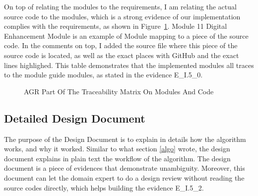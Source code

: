 On top of relating the modules to the requirements, I am relating the actual source code to the modules, which is a strong evidence of our implementation complies with the requirements, as shown in Figure~\ref{fig_agr_mtm_modules_code}. Module 11 Digital Enhancement Module is an example of Module mapping to a piece of the source code. In the comments on top, I added the source file where this piece of the source code is located, as well as the exact places with GitHub and the exact lines highlighed. This table demonstrates that the implemented modules all traces to the module guide modules, as stated in the evidence E\_I.5\_0.

\begin{figure}[H]
    \centering
    \caption[AGR Part Of The Traceability Matrix On Modules And Code]{AGR Part Of The Traceability Matrix On Modules And Code}
    \label{fig_agr_mtm_modules_code}
\end{figure}

\subsection{Detailed Design Document}
The purpose of the Design Document \cite{DD} is to explain in details how the algorithm works, and why it worked. Similar to what section \ref{algo} wrote, the design document explains in plain text the workflow of the algorithm. The design document is a piece of evidences that demonstrate unambiguity. Moreover, this document can let the domain expert to do a design review  without reading the source codes directly,  which helps building the evidence E\_I.5\_2.

